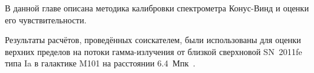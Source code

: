В данной главе описана методика калибровки спектрометра Конус-Винд и оценки его чувствительности. 

Результаты расчётов, проведённых соискателем, были использованы для оценки верхних 
пределов на потоки гамма-излучения от близкой сверхновой SN~2011fe типа Ia в 
галактике M101 на расстоянии 6.4~Мпк~\citep{Margutti_2012ApJ}.

\clearpage